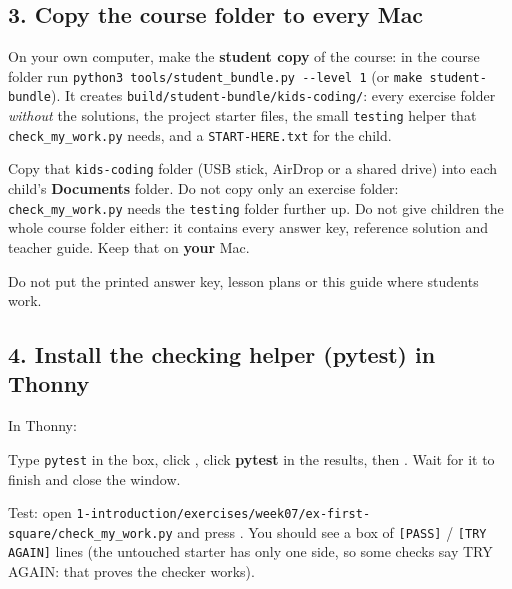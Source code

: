 \documentclass[level=1,teacher]{kidscode}
\begin{document}
\subsection{3. Copy the course folder to every Mac}
\begin{checklist}
  \item On your own computer, make the \textbf{student copy} of the course: in the course folder run
        \texttt{python3 tools/student\_bundle.py -{}-level 1} (or \texttt{make student-bundle}). It creates
        \texttt{build/\allowbreak student-bundle/\allowbreak kids-coding/}: every exercise folder \emph{without} the solutions, the
        project starter files, the small \texttt{testing} helper that \texttt{check\_my\_work.py} needs, and a
        \texttt{START-HERE.txt} for the child.
  \item Copy that \texttt{kids-coding} folder (USB stick, AirDrop or a shared drive) into each child's
        \textbf{Documents} folder. Do not copy only an exercise folder: \texttt{check\_my\_work.py}
        needs the \texttt{testing} folder further up. Do not give children the whole course folder either:
        it contains every answer key, reference solution and teacher guide. Keep that on \textbf{your} Mac.
  \item Do not put the printed answer key, lesson plans or this guide where students work.
\end{checklist}

\subsection{4. Install the checking helper (pytest) in Thonny}
\begin{checklist}
  \item In Thonny: 
  \item Type \texttt{pytest} in the box, click , click \textbf{pytest} in the results,
        then . Wait for it to finish and close the window.
  \item Test: open \texttt{1-introduction/\allowbreak{}exercises/\allowbreak{}week07/\allowbreak{}ex-first-square/\allowbreak{}check\_my\_work.py} and press
        . You should see a box of \texttt{[PASS]} / \texttt{[TRY AGAIN]} lines (the untouched
        starter has only one side, so some checks say TRY AGAIN: that proves the checker works).
\end{checklist}
\end{document}
